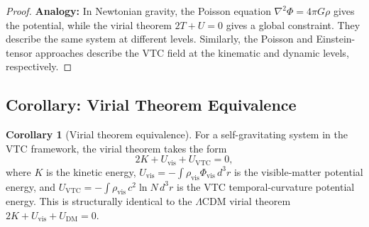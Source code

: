 \documentclass[11pt,a4paper]{article}
\theoremstyle{definition}
\newtheorem{corollary}[theorem]{Corollary}
\newcommand{\vis}{\mathrm{vis}}
\newcommand{\DM}{\mathrm{DM}}
\newcommand{\VTC}{\mathrm{VTC}}
\begin{document}
\begin{proof}
\textbf{Analogy:} In Newtonian gravity, the Poisson equation $\nabla^2\Phi = 4\pi G\rho$ gives the potential, while the virial theorem $2T + U = 0$ gives a global constraint. They describe the same system at different levels. Similarly, the Poisson and Einstein-tensor approaches describe the VTC field at the kinematic and dynamic levels, respectively.
\end{proof}

\subsection{Corollary: Virial Theorem Equivalence}
\label{cor:virial}

\begin{corollary}[Virial theorem equivalence]
For a self-gravitating system in the VTC framework, the virial theorem takes the form
\begin{equation}
2K + U_{\vis} + U_{\VTC} = 0,
\end{equation}
where $K$ is the kinetic energy, $U_{\vis} = -\int \rho_{\vis}\Phi_{\vis}\,d^3r$ is the visible-matter potential energy, and $U_{\VTC} = -\int \rho_{\vis}\,c^2\ln N\,d^3r$ is the VTC temporal-curvature potential energy. This is structurally identical to the $\Lambda$CDM virial theorem $2K + U_{\vis} + U_{\DM} = 0$.
\end{corollary}
\end{document}
